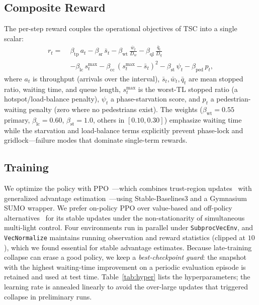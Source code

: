 \documentclass[conference,a4paper]{IEEEtran}
\begin{document}
\subsection{Composite Reward}
The per-step reward couples the operational objectives of TSC into a single
scalar:
\begin{align}
r_t =\; & \beta_{\text{tp}}\,a_t
        - \beta_{\text{sr}}\,\bar{s}_t
        - \beta_{\text{wt}}\,\tfrac{\bar{w}_t}{D_w}
        - \beta_{\text{ql}}\,\tfrac{\bar{q}_t}{D_q} \nonumber\\
      & - \beta_{\text{lc}}\,s^{\max}_t
        - \beta_{\text{cc}}\,(s^{\max}_t-\bar{s}_t)^2
        - \beta_{\text{st}}\,\psi_t
        - \beta_{\text{ped}}\,p_t,
\label{eq:reward}
\end{align}
where $a_t$ is throughput (arrivals over the interval), $\bar{s}_t,\bar{w}_t,
\bar{q}_t$ are mean stopped ratio, waiting time, and queue length, $s^{\max}_t$
is the worst-TL stopped ratio (a hotspot/load-balance penalty), $\psi_t$ a
phase-starvation score, and $p_t$ a pedestrian-waiting penalty (zero where no
pedestrians exist). The weights ($\beta_{\text{wt}}{=}0.55$ primary,
$\beta_{\text{lc}}{=}0.60$, $\beta_{\text{st}}{=}1.0$, others
in $[0.10,0.30]$) emphasize waiting time while the starvation and load-balance
terms explicitly prevent phase-lock and gridlock---failure modes that dominate
single-term rewards.

\subsection{Training}
We optimize the policy with PPO~\cite{schulman2017proximal}---which combines
trust-region updates~\cite{schulman2015trust} with generalized advantage
estimation~\cite{schulman2016high}---using
Stable-Baselines3 and a Gymnasium~\cite{towers2023gymnasium}
SUMO wrapper. We prefer on-policy PPO over value-based and off-policy
alternatives~\cite{mnih2016asynchronous,lillicrap2016continuous,haarnoja2018soft}
for its stable updates under the non-stationarity of simultaneous multi-light
control. Four environments run in parallel under \texttt{SubprocVecEnv}, and
\texttt{VecNormalize} maintains running observation and reward statistics
(clipped at $10$), which we found essential for stable advantage estimates.
Because late-training collapse can erase a good policy, we keep a
\emph{best-checkpoint guard}: the snapshot with the highest waiting-time
improvement on a periodic evaluation episode is retained and used at test time.
Table~\ref{tab:hyper} lists the hyperparameters; the learning rate is annealed
linearly to avoid the over-large updates that triggered collapse in preliminary
runs.
\end{document}

